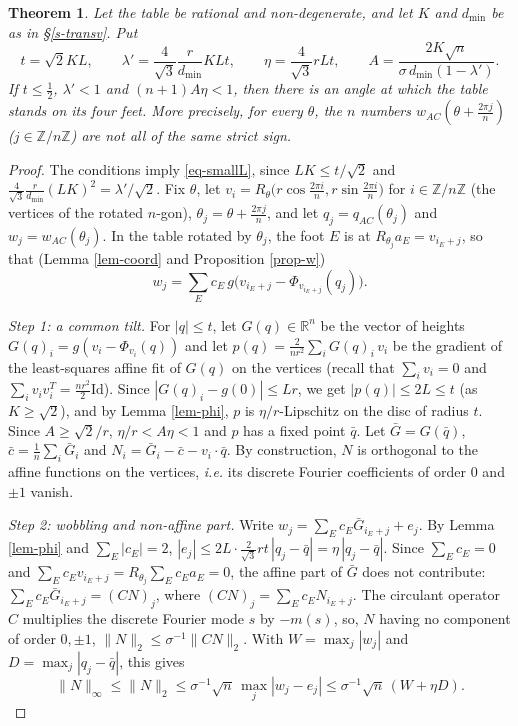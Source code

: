 \documentclass[a4paper,11pt,twoside,leqno]{article}
\newtheorem{teo}{Theorem}[section]
\newcommand{\ie}[0]{\emph{i.e.} }
\newcommand{\rr}[0]{\ensuremath{\mathbb{R}}}
\newcommand{\zz}[0]{\ensuremath{\mathbb{Z}}}
\numberwithin{equation}{section}
\begin{document}
\begin{teo}\label{teo-orbit}
Let the table be rational and non-degenerate, and let $K$ and $d_{\min}$ be as in \S{}\ref{s-transv}. Put
\[
t = \sqrt{2} K L,
\qquad
\lambda' = \frac{4}{\sqrt{3}} \frac{r}{d_{\min}} K L t,
\qquad
\eta = \frac{4}{\sqrt 3} r L t,
\qquad
A = \frac{2K\sqrt{n}}{\sigma\, d_{\min} (1-\lambda')}.
\]
If $t \leq \frac{1}{2}$, $\lambda' < 1$ and $(n+1) A \eta < 1$, then there is an angle at which the table stands on its four feet. More precisely, for every $\theta$, the $n$ numbers $w_{AC}(\theta + \frac{2\pi j}{n})$ ($j \in \zz/n\zz$) are not all of the same strict sign.
\end{teo}
\begin{proof}
The conditions imply \eqref{eq-smallL}, since $LK \leq t/\sqrt{2}$ and $\frac{4}{\sqrt3} \frac{r}{d_{\min}} (LK)^2 = \lambda'/\sqrt{2}$. Fix $\theta$, let $v_i = R_\theta\big(r\cos\frac{2\pi i}{n}, r\sin \frac{2\pi i}{n}\big)$ for $i \in \zz/n\zz$ (the vertices of the rotated $n$-gon), $\theta_j = \theta + \frac{2 \pi j}{n}$, and let $q_j = q_{AC}(\theta_j)$ and $w_j = w_{AC}(\theta_j)$. In the table rotated by $\theta_j$, the foot $E$ is at $R_{\theta_j} a_E = v_{i_E + j}$, so that (Lemma \ref{lem-coord} and Proposition \ref{prop-w})
\[
w_j = \sum_E c_E\, g\big(v_{i_E + j} - \Phi_{v_{i_E+j}}(q_j)\big).
\]

\emph{Step 1: a common tilt.} For $|q| \leq t$, let $G(q) \in \rr^{n}$ be the vector of heights $G(q)_i = g(v_i - \Phi_{v_i}(q))$ and let $p(q) = \frac{2}{n r^2} \sum_i G(q)_i\, v_i$ be the gradient of the least-squares affine fit of $G(q)$ on the vertices (recall that $\sum_i v_i = 0$ and $\sum_i v_i v_i^T = \frac{nr^2}{2}\mathrm{Id}$). Since $|G(q)_i - g(0)| \leq Lr$, we get $|p(q)| \leq 2L \leq t$ (as $K \geq \sqrt{2}$), and by Lemma \ref{lem-phi}, $p$ is $\eta/r$-Lipschitz on the disc of radius $t$. Since $A \geq \sqrt{2}/r$, $\eta/r < A\eta < 1$ and $p$ has a fixed point $\bar q$. Let $\bar G = G(\bar q)$, $\bar c = \frac{1}{n}\sum_i \bar G_i$ and $N_i = \bar G_i - \bar c - v_i \cdot \bar q$. By construction, $N$ is orthogonal to the affine functions on the vertices, \ie its discrete Fourier coefficients of order $0$ and $\pm 1$ vanish.

\emph{Step 2: wobbling and non-affine part.} Write $w_j = \sum_E c_E \bar G_{i_E + j} + e_j$. By Lemma \ref{lem-phi} and $\sum_E |c_E| = 2$, $|e_j| \leq 2 L \cdot \frac{2}{\sqrt{3}} r t\, |q_j - \bar q| = \eta\, |q_j - \bar q|$. Since $\sum_E c_E = 0$ and $\sum_E c_E v_{i_E+j} = R_{\theta_j} \sum_E c_E a_E = 0$, the affine part of $\bar G$ does not contribute: $\sum_E c_E \bar G_{i_E + j} = (CN)_j$, where $(CN)_j = \sum_E c_E N_{i_E + j}$. The circulant operator $C$ multiplies the discrete Fourier mode $s$ by $-m(s)$, so, $N$ having no component of order $0, \pm 1$, $\|N\|_2 \leq \sigma^{-1} \|CN\|_2$. With $W = \max_j |w_j|$ and $D = \max_j |q_j - \bar q|$, this gives
\[
\|N\|_\infty \leq \|N\|_2 \leq \sigma^{-1} \sqrt{n}\, \max_j |w_j - e_j| \leq \sigma^{-1}\sqrt{n}\,(W + \eta D).
\]


\end{proof}
\end{document}
